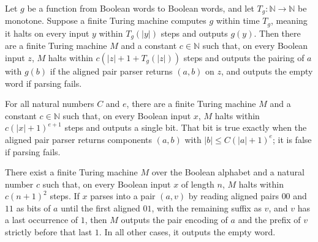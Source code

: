 \begin{theorem}
\label{Turing.FinTM.computesFunInTime_pairMapSnd}
\leanok
{}
Let $g$ be a function from Boolean words to Boolean words, and let
$T_g:\mathbb{N}\to\mathbb{N}$ be monotone. Suppose a finite Turing machine computes $g$
within time $T_g$, meaning it halts on every input $y$ within $T_g(|y|)$ steps and
outputs $g(y)$. Then there are a finite Turing machine $M$ and a constant
$c\in\mathbb{N}$ such that, on every Boolean input $z$, $M$ halts within
$c(|z|+1+T_g(|z|))$ steps and outputs the pairing of $a$ with $g(b)$ if the aligned pair
parser returns $(a,b)$ on $z$, and outputs the empty word if parsing fails.
\end{theorem}

\begin{theorem}
\label{Turing.FinTM.computesFunInTime_pairLenCheck}
\leanok
{}
For all natural numbers $C$ and $e$, there are a finite Turing machine $M$ and a
constant $c\in\mathbb{N}$ such that, on every Boolean input $x$, $M$ halts within
$c(|x|+1)^{e+1}$ steps and outputs a single bit. That bit is true exactly when the
aligned pair parser returns components $(a,b)$ with $|b|\le C(|a|+1)^e$; it is false if
parsing fails.
\end{theorem}

\begin{theorem}
\label{Turing.FinTM.computesFunInTime_stripLast}
\leanok
{}
There exist a finite Turing machine $M$ over the Boolean alphabet and a natural number
$c$ such that, on every Boolean input $x$ of length $n$, $M$ halts within $c(n+1)^2$
steps. If $x$ parses into a pair $(a,v)$ by reading aligned pairs $00$ and $11$ as bits
of $a$ until the first aligned $01$, with the remaining suffix as $v$, and $v$ has a
last occurrence of $1$, then $M$ outputs the pair encoding of $a$ and the prefix of $v$
strictly before that last $1$. In all other cases, it outputs the empty word.
\end{theorem}

